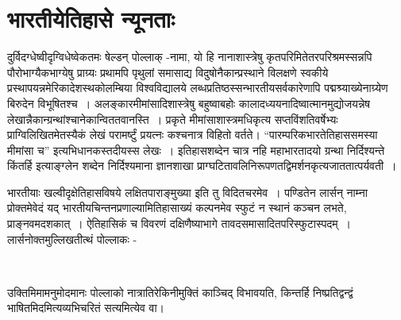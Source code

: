 \section*{भारतीयेतिहासे न्यूनताः}

दुर्विदग्धेष्वीदृग्विधेष्वेकतमः षेल्डन् पोल्लाक् -नामा, यो हि नानाशास्त्रेषु कृतपरिमितेतरपरिश्रमस्सन्नपि पौरोभाग्यैकभाग्येषु प्राग्र्यः प्रथामपि पृथुलां समासाद्य विदुषो\break नैकान्प्रस्थाने विलक्षणे स्वकीये प्रस्थापयन्नमेरिकादेशस्थकोलम्बिया विश्वविद्यालये लब्धप्रतिष्ठस्सन्भारतीयसर्वकारेणापि पद्मश्र्याख्येनाग्र्येण बिरुदेन विभूषितश्च~। अलङ्कारमीमांसादिशास्त्रेषु बहुष्वाबहोः कालादध्ययनादिष्वात्मानमुद्योजयन्नेष लेखान्नैकान्ग्रन्थांश्चानेकान्विततवानस्ति~। प्रकृते मीमांसाशास्त्रमधिकृत्य सप्तविंशतिवर्षेभ्यः प्राग्विलिखितमेतस्यैकं लेखं परामर्ष्टुं प्रयत्नः कश्चनात्र विहितो वर्तते। “पारम्परिकभारतेतिहाससमस्या मीमांसा च”  इत्यभिधानकस्तदीयस्स लेखः~। इतिहासशब्देन चात्र नहि महाभारतादयो ग्रन्था निर्दिश्यन्ते किंतर्हि  इत्याङ्ग्लेन शब्देन निर्दिश्यमाना ज्ञानशाखा प्राग्घटितावलिनिरूपणतद्विमर्शनकृत्यजाततात्पर्यवती~।

भारतीयाः खल्वीदृक्षेतिहासविषये लक्षितपाराङ्मुख्या इति तु विदितचरमेव~। पण्डितेन लार्सन् नाम्ना प्रोक्तमेवेदं यद् भारतीयचिन्तनप्रणाल्यामितिहासाख्यं कल्पनमेव स्फुटं न स्थानं कञ्चन लभते, प्राङ्नवमदशकात्~। ऐतिहासिकं च विवरणं दक्षिणैष्याभागे तावदसमासादितपरिस्फुटास्पदम्~। लार्सनोक्तमुल्लिखतीत्थं पोल्लाकः -

\begin{myquote}

~\hfill {}
\end{myquote}

\newpage

उक्तिमिमामनुमोदमानः पोल्लाको नात्रातिरेकिनीमुक्तिं काञ्चिद् विभावयति, किन्तर्हि निष्प्रतिद्वन्द्वं भाषितमिदमित्यव्यभिचरितं सत्यमित्येव वा।

